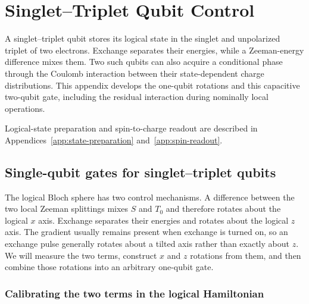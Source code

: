 \FloatBarrier
\section{Singlet--Triplet Qubit Control}
\label{app:st-control}

A singlet--triplet qubit stores its logical state in the singlet and
unpolarized triplet of two electrons. Exchange separates their energies,
while a Zeeman-energy difference mixes them. Two such qubits can also
acquire a conditional phase through the Coulomb interaction between
their state-dependent charge distributions. This appendix develops the
one-qubit rotations and this capacitive two-qubit gate, including the
residual interaction during nominally local operations.

Logical-state preparation and spin-to-charge readout are described in
Appendices~\ref{app:state-preparation} and~\ref{app:spin-readout}.

\subsection{Single-qubit gates for singlet--triplet qubits}
\label{sec:calibration-st-rotations}
\label{sec:measurement-st-exchange}

The logical Bloch sphere has two control mechanisms. A difference
between the two local Zeeman splittings mixes $S$ and $T_0$ and
therefore rotates about the logical $x$ axis. Exchange separates
their energies and rotates about the logical $z$ axis. The gradient
usually remains present when exchange is turned on, so an exchange
pulse generally rotates about a tilted axis rather than exactly
about $z$. We will measure the two terms, construct $x$ and $z$
rotations from them, and then combine those rotations into an
arbitrary one-qubit gate.

\subsubsection{Calibrating the two terms in the logical Hamiltonian}

